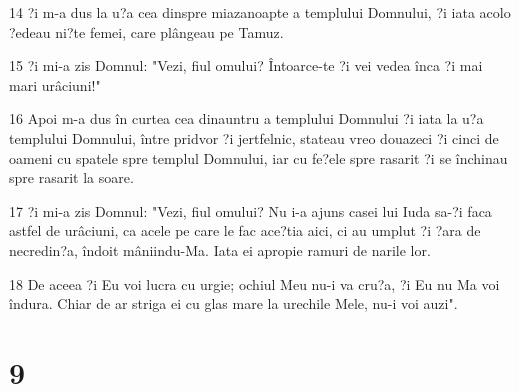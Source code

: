\par 14 ?i m-a dus la u?a cea dinspre miazanoapte a templului Domnului, ?i iata acolo ?edeau ni?te femei, care plângeau pe Tamuz.
\par 15 ?i mi-a zis Domnul: "Vezi, fiul omului? Întoarce-te ?i vei vedea înca ?i mai mari urâciuni!"
\par 16 Apoi m-a dus în curtea cea dinauntru a templului Domnului ?i iata la u?a templului Domnului, între pridvor ?i jertfelnic, stateau vreo douazeci ?i cinci de oameni cu spatele spre templul Domnului, iar cu fe?ele spre rasarit ?i se închinau spre rasarit la soare.
\par 17 ?i mi-a zis Domnul: "Vezi, fiul omului? Nu i-a ajuns casei lui Iuda sa-?i faca astfel de urâciuni, ca acele pe care le fac ace?tia aici, ci au umplut ?i ?ara de necredin?a, îndoit mâniindu-Ma. Iata ei apropie ramuri de narile lor.
\par 18 De aceea ?i Eu voi lucra cu urgie; ochiul Meu nu-i va cru?a, ?i Eu nu Ma voi îndura. Chiar de ar striga ei cu glas mare la urechile Mele, nu-i voi auzi".

\chapter{9}

